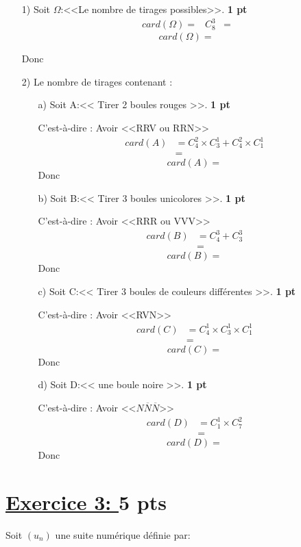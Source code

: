 \documentclass[12pt]{article}
\begin{document}
\begin{itemize}
\item[1)] Soit $\Omega$:<<Le nombre de tirages possibles>>. \textbf{1 pt}
\begin{align*}
card(\Omega)=&C_{8}^{3}
		&=	
\end{align*}
\[card(\Omega)=\]

Donc \textcolor{green}{}
\item[2)] Le nombre de tirages contenant :
\begin{itemize}
\item[a)] Soit A:<< Tirer 2 boules rouges >>. \textbf{1 pt}

C'est-à-dire : Avoir <<RRV ou RRN>>
\begin{align*}
card(A)&=C_{4}^{2}\times C_{3}^{1}+C_{4}^{2}\times C_{1}^{1}\\
		&=
\end{align*}
\[card(A)=\]
Donc \textcolor{green}{}
\item[b)] Soit B:<< Tirer 3 boules unicolores >>. \textbf{1 pt}

C'est-à-dire : Avoir <<RRR ou VVV>>
\begin{align*}
card(B)&=C_{4}^{3}+C_{3}^{3}\\
	&=
\end{align*}
\[card(B)=\]
Donc \textcolor{green}{}
\item[c)] Soit C:<< Tirer 3 boules de couleurs différentes >>. \textbf{1 pt}

C'est-à-dire : Avoir <<RVN>>
\begin{align*}
card(C)&=C_{4}^{1} \times C_{3}^{1} \times C_{1}^{1}\\
		&=
\end{align*}
\[card(C)=\]
Donc \textcolor{green}{}
\item[d)] Soit D:<< une boule noire >>. \textbf{1 pt}

C'est-à-dire : Avoir <<$N\overline{N}\overline{N}$>>
\begin{align*}
card(D)&=C_{1}^{1} \times C_{7}^{2}\\
		&=
\end{align*}
\[card(D)=\]
Donc \textcolor{green}{}
\end{itemize}
\end{itemize}
\section*{\underline{Exercice 3: }\textbf{5 pts}}
Soit $(u_n)$ une suite numérique définie par:
\end{document}

